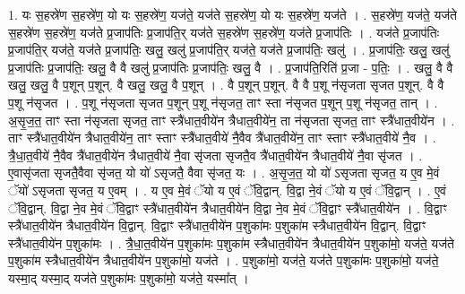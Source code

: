 \documentclass[17pt]{extarticle}
\begin{document}
1. यः स॒हस्रे॑ण स॒हस्रे॑ण॒ यो यः स॒हस्रे॑ण॒ यज॑ते॒ यज॑ते स॒हस्रे॑ण॒ यो यः स॒हस्रे॑ण॒ यज॑ते । . स॒हस्रे॑ण॒ यज॑ते॒ यज॑ते स॒हस्रे॑ण स॒हस्रे॑ण॒ यज॑ते प्र॒जाप॑तिः प्र॒जाप॑ति॒र् यज॑ते स॒हस्रे॑ण स॒हस्रे॑ण॒ यज॑ते प्र॒जाप॑तिः । . यज॑ते प्र॒जाप॑तिः प्र॒जाप॑ति॒र् यज॑ते॒ यज॑ते प्र॒जाप॑तिः॒ खलु॒ खलु॑ प्र॒जाप॑ति॒र् यज॑ते॒ यज॑ते प्र॒जाप॑तिः॒ खलु॑ । . प्र॒जाप॑तिः॒ खलु॒ खलु॑ प्र॒जाप॑तिः प्र॒जाप॑तिः॒ खलु॒ वै वै खलु॑ प्र॒जाप॑तिः प्र॒जाप॑तिः॒ खलु॒ वै । . प्र॒जाप॑ति॒रिति॑ प्र॒जा - प॒तिः॒ । . खलु॒ वै वै खलु॒ खलु॒ वै प॒शून् प॒शून्. वै खलु॒ खलु॒ वै प॒शून् । . वै प॒शून् प॒शून्. वै वै प॒शू न॑सृजता सृजत प॒शून्. वै वै प॒शू न॑सृजत । . प॒शू न॑सृजता सृजत प॒शून् प॒शू न॑सृजत॒ ताꣳ स्ता न॑सृजत प॒शून् प॒शू न॑सृजत॒ तान् । . अ॒सृ॒ज॒त॒ ताꣳ स्ता न॑सृजता सृजत॒ ताꣳ स्त्रै॑धात॒वीये॑न त्रैधात॒वीये॑न॒ ता न॑सृजता सृजत॒ 
ताꣳ स्त्रै॑धात॒वीये॑न । . ताꣳ स्त्रै॑धात॒वीये॑न त्रैधात॒वीये॑न॒ ताꣳ स्ताꣳ स्त्रै॑धात॒वीये॑ नै॒वैव त्रै॑धात॒वीये॑न॒ ताꣳ 
स्ताꣳ स्त्रै॑धात॒वीये॑ नै॒व । . त्रै॒धा॒त॒वीये॑ नै॒वैव त्रै॑धात॒वीये॑न त्रैधात॒वीये॑ नै॒वा सृ॑जता सृजतै॒व त्रै॑धात॒वीये॑न त्रैधात॒वीये॑ नै॒वा सृ॑जत । . ए॒वासृ॑जता सृजतै॒वैवा सृ॑जत॒ यो यो॑ ऽसृजतै॒ वैवा सृ॑जत॒ यः । . अ॒सृ॒ज॒त॒ यो यो॑ ऽसृजता सृजत॒ य ए॒व मे॒वं ॅयो॑ ऽसृजता सृजत॒ य ए॒वम् । . य ए॒व मे॒वं ॅयो य ए॒वं ॅवि॒द्वान्. वि॒द्वा ने॒वं ॅयो य ए॒वं ॅवि॒द्वान् । . ए॒वं ॅवि॒द्वान्. वि॒द्वा ने॒व मे॒वं ॅवि॒द्वाꣳ स्त्रै॑धात॒वीये॑न त्रैधात॒वीये॑न वि॒द्वा ने॒व मे॒वं 
ॅवि॒द्वाꣳ स्त्रै॑धात॒वीये॑न । . वि॒द्वाꣳ स्त्रै॑धात॒वीये॑न त्रैधात॒वीये॑न वि॒द्वान्. वि॒द्वाꣳ स्त्रै॑धात॒वीये॑न प॒शुका॑मः प॒शुका॑म स्त्रैधात॒वीये॑न वि॒द्वान्. वि॒द्वाꣳ स्त्रै॑धात॒वीये॑न प॒शुका॑मः । . त्रै॒धा॒त॒वीये॑न प॒शुका॑मः प॒शुका॑म स्त्रैधात॒वीये॑न त्रैधात॒वीये॑न प॒शुका॑मो॒ यज॑ते॒ यज॑ते प॒शुका॑म स्त्रैधात॒वीये॑न त्रैधात॒वीये॑न प॒शुका॑मो॒ यज॑ते । . प॒शुका॑मो॒ यज॑ते॒ यज॑ते प॒शुका॑मः प॒शुका॑मो॒ यज॑ते॒ यस्मा॒द् यस्मा॒द् यज॑ते प॒शुका॑मः प॒शुका॑मो॒ यज॑ते॒ यस्मा᳚त् । \newline
\end{document}

